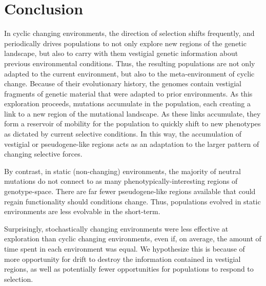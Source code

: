 \documentclass[letterpaper]{article}
\begin{document}
\section{Conclusion}
In cyclic changing environments, the direction of selection shifts frequently, and periodically drives populations to not only explore new regions of the genetic landscape, but also to carry with them vestigial genetic information about previous environmental conditions. Thus, the resulting populations are not only adapted to the current environment, but also to the meta-environment of cyclic change. Because of their evolutionary history, the genomes contain vestigial fragments of genetic material that were adapted to prior environments.
As this exploration proceeds, mutations accumulate in the population, each creating a link to a new region of the mutational landscape.
As these links accumulate, they form a reservoir of mobility for the population to quickly shift to new phenotypes as dictated by current selective conditions. In this way, the accumulation of vestigial or pseudogene-like regions acts as an adaptation to the larger pattern of changing selective forces.

By contrast, in static (non-changing) environments, the majority of neutral mutations do not connect to as many phenotypically-interesting regions of genotype-space. There are far fewer pseudogene-like regions available that could regain functionality should conditions change. Thus, populations evolved in static environments are less evolvable in the short-term.

Surprisingly, stochastically changing environments were less effective at exploration
than cyclic changing environments, even if, on average, the amount of time spent in each environment was equal. We hypothesize this is because of more opportunity for drift to destroy the information contained in vestigial regions, as well as potentially fewer opportunities for populations to respond to selection.
\end{document}
